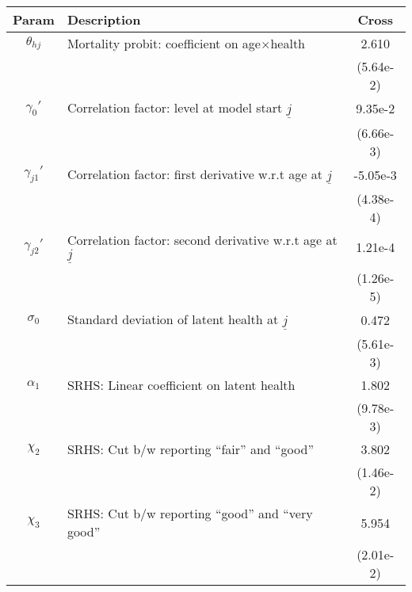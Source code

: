 \begin{table}[ht]\label{CrossWomenOtherParams}
\footnotesize
\begin{center}
\begin{tabular}{clc}
\hline \hline
Param & Description & Cross \\
\hline
$\theta_{hj}$ & Mortality probit: coefficient on age$\times$health & 2.610 \\
 & & (5.64e-2) \\
$\gamma_{0}'$ & Correlation factor: level at model start $\underline{j}$ & 9.35e-2 \\
 & & (6.66e-3) \\
$\gamma_{j1}'$ & Correlation factor: first derivative w.r.t age at $\underline{j}$ & -5.05e-3 \\
 & & (4.38e-4) \\
$\gamma_{j2}'$ & Correlation factor: second derivative w.r.t age at $\underline{j}$ & 1.21e-4 \\
 & & (1.26e-5) \\
$\sigma_{0}$ & Standard deviation of latent health at $\underline{j}$ & 0.472 \\
 & & (5.61e-3) \\
$\alpha_1$ & SRHS: Linear coefficient on latent health & 1.802 \\
 & & (9.78e-3) \\
$\chi_2$ & SRHS: Cut b/w reporting ``fair'' and ``good'' & 3.802 \\
 & & (1.46e-2) \\
$\chi_3$ & SRHS: Cut b/w reporting ``good'' and ``very good'' & 5.954 \\
 & & (2.01e-2) \\
\hline\hline
\end{tabular}
\end{center}
\end{table}
